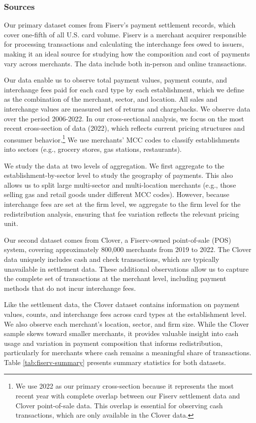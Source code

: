 \documentclass[main.tex]{subfiles}
\begin{document}
\subsubsection{Sources}

Our primary dataset comes from Fiserv's payment settlement records, which cover one-fifth of all U.S. card volume.
Fiserv is a merchant acquirer responsible for processing transactions and calculating the interchange fees owed to issuers, making it an ideal source for studying how the composition and cost of payments vary across merchants.
The data include both in-person and online transactions.

Our data enable us to observe total payment values, payment counts, and interchange fees paid for each card type by each establishment, which we define as the combination of the merchant, sector, and location.
All sales and interchange values are measured net of returns and chargebacks. We observe data over the period 2006-2022. In our cross-sectional analysis, we focus on the most recent cross-section of data (2022), which reflects current pricing structures and consumer behavior.\footnote{We use 2022 as our primary cross-section because it represents the most recent year with complete overlap between our Fiserv settlement data and Clover point-of-sale data. This overlap is essential for observing cash transactions, which are only available in the Clover data.} 
We use merchants' MCC codes to classify establishments into sectors (e.g., grocery stores, gas stations, restaurants).

We study the data at two levels of aggregation. We first aggregate to the establishment-by-sector level to study the geography of payments.
This also allows us to split large multi-sector and multi-location merchants (e.g., those selling gas and retail goods under different MCC codes).
However, because interchange fees are set at the firm level, we aggregate to the firm level for the redistribution analysis, ensuring that fee variation reflects the relevant pricing unit.

Our second dataset comes from Clover, a Fiserv-owned point-of-sale (POS) system, covering approximately 800,000 merchants from 2019 to 2022.
The Clover data uniquely includes cash and check transactions, which are typically unavailable in settlement data.
These additional observations allow us to capture the complete set of transactions at the merchant level, including payment methods that do not incur interchange fees.

Like the settlement data, the Clover dataset contains information on payment values, counts, and interchange fees across card types at the establishment level.
We also observe each merchant's location, sector, and firm size.
While the Clover sample skews toward smaller merchants, it provides valuable insight into cash usage and variation in payment composition that informs redistribution, particularly for merchants where cash remains a meaningful share of transactions.
Table \ref{tab:fiserv-summary} presents summary statistics for both datasets.
\end{document}
